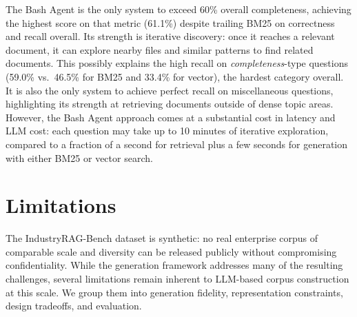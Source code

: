 \documentclass{article}
\begin{document}
The Bash Agent is the only system to exceed 60\% overall completeness, achieving the highest score on that metric (61.1\%) despite trailing BM25 on correctness and recall overall. Its strength is iterative discovery: once it reaches a relevant document, it can explore nearby files and similar patterns to find related documents. This possibly explains the high recall on \textit{completeness}-type questions (59.0\% vs.\ 46.5\% for BM25 and 33.4\% for vector), the hardest category overall. It is also the only system to achieve perfect recall on miscellaneous questions, highlighting its strength at retrieving documents outside of dense topic areas. However, the Bash Agent approach comes at a substantial cost in latency and LLM cost: each question may take up to 10 minutes of iterative exploration, compared to a fraction of a second for retrieval plus a few seconds for generation with either BM25 or vector search.

\section{Limitations}
\label{sec:limitations}

The IndustryRAG-Bench dataset is synthetic: no real enterprise corpus of comparable scale and diversity can be released publicly without compromising confidentiality. While the generation framework addresses many of the resulting challenges, several limitations remain inherent to LLM-based corpus construction at this scale. We group them into generation fidelity, representation constraints, design tradeoffs, and evaluation.
\end{document}
